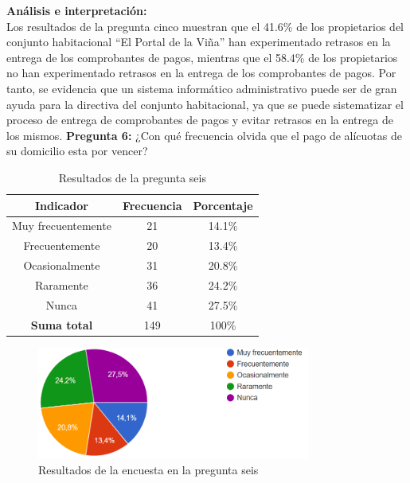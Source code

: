 \textbf{Análisis e interpretación:}\\
Los resultados de la pregunta cinco muestran que el 41.6\% de los propietarios del conjunto habitacional {\textquotedblleft}El Portal de la Viña{\textquotedblright} han experimentado retrasos en la entrega de los comprobantes de pagos, mientras que el 58.4\% de los propietarios no han experimentado retrasos en la entrega de los comprobantes de pagos.
Por tanto, se evidencia que un sistema informático administrativo puede ser de gran ayuda para la directiva del conjunto habitacional, ya que se puede sistematizar el proceso de entrega de comprobantes de pagos y evitar retrasos en la entrega de los mismos.
\bigbreak
\textbf{Pregunta 6:} ¿Con qué frecuencia olvida que el pago de alícuotas de su domicilio esta por vencer?
    \begin{table}[H]
        \centering
        \caption{Resultados de la pregunta seis}
        \begin{tabular}{|c|c|c|}
            \hline
            \textbf{Indicador} & \textbf{Frecuencia} &  \textbf{Porcentaje} \\
            \hline
            Muy frecuentemente & 21 & 14.1\% \\
            \hline
            Frecuentemente & 20 & 13.4\% \\
            \hline
            Ocasionalmente & 31 & 20.8\% \\
            \hline
            Raramente & 36 & 24.2\% \\
            \hline
            Nunca & 41 & 27.5\% \\
            \hline
            \textbf{Suma total} & 149 & 100\% \\
            \hline
        \end{tabular}\label{tab:table_preg_6}
    \end{table}
    \begin{figure}[H]
        \centering
        \includegraphics[width=0.8\textwidth]{resources/images/p6}
        \caption{Resultados de la encuesta en la pregunta seis}\label{fig:figure_p6}
    \end{figure}

